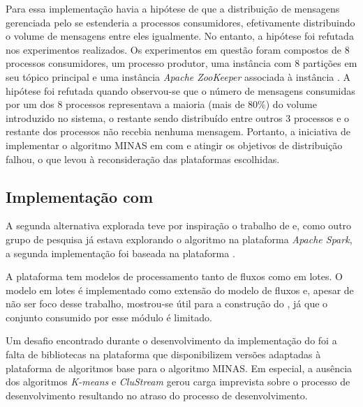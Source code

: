 Para essa implementação havia a hipótese de que a distribuição de
mensagens gerenciada pelo \kafka
se estenderia a processos consumidores, efetivamente distribuindo o volume de
mensagens entre eles igualmente.
No entanto, a hipótese foi refutada nos experimentos realizados.
Os experimentos em questão foram compostos de 8 processos consumidores, um
processo produtor, uma instância \kafka com 8 partições em seu tópico principal
e uma instância \emph{Apache ZooKeeper} associada à instância \kafka.
A hipótese foi refutada quando observou-se que o número de
mensagens consumidas por um dos 8 processos representava a maioria (mais de
80\%) do volume introduzido no sistema, o restante sendo distribuído entre
outros 3 processos e o restante dos processos não recebia nenhuma mensagem.
Portanto, a iniciativa de implementar o algoritmo MINAS em \python com \kafka e
atingir os objetivos de distribuição falhou, o que levou à reconsideração das
plataformas escolhidas.

\subsection{Implementação com \flink}


A segunda alternativa explorada teve por inspiração o trabalho de
 e, como outro grupo de pesquisa já estava explorando
o algoritmo na plataforma \emph{Apache Spark}, a segunda implementação
foi baseada na plataforma \flink.

A plataforma \flink tem modelos de processamento tanto de fluxos como em lotes.
O modelo em lotes é implementado como extensão do modelo de fluxos e, apesar
de não ser foco desse trabalho, mostrou-se útil para a construção do \offline,
já que o conjunto consumido por esse módulo é limitado.

Um desafio encontrado durante o desenvolvimento da implementação do \mfog foi a falta
de bibliotecas na plataforma \flink que disponibilizem versões adaptadas
à plataforma de algoritmos base para o algoritmo MINAS.
Em especial, a ausência dos algoritmos \emph{K-means} e \emph{CluStream}
gerou carga imprevista sobre o processo de desenvolvimento
resultando no atraso do processo de desenvolvimento.

